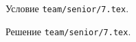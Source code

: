\problem
Условие \texttt{team/senior/7.tex}.

\solution Решение \texttt{team/senior/7.tex}.
\endproblem
